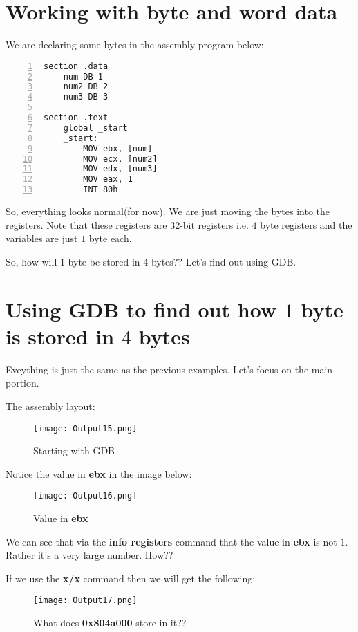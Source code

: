 \documentclass{article}
\makeatletter
\renewcommand\paragraph{\@startsection{paragraph}{4}{\z@}{-3.25ex \@plus -1ex \@minus -.2ex}{1.5ex \@plus .2ex}{\normalfont\normalsize\bfseries}}
\makeatother
\begin{document}
\section{Working with byte and word data}\label{sec:byteANDword}
\paragraph{}
We are declaring some bytes in the assembly program below:
\begin{Verbatim}[numbers=left, frame=single]
section .data
	num DB 1
	num2 DB 2
	num3 DB 3

section .text
	global _start
	_start:
		MOV ebx, [num]
		MOV ecx, [num2]
		MOV edx, [num3]
		MOV eax, 1
		INT 80h
\end{Verbatim}
So, everything looks normal(for now). We are just moving the bytes into the registers. Note that these registers are $32$-bit registers i.e. $4$ byte registers and the variables are just $1$ byte each.

So, how will $1$ byte be stored in 4 bytes?? Let's find out using GDB.

\newpage
\section{Using GDB to find out how $1$ byte is stored in $4$ bytes}\label{sec:how}
\paragraph{}
Eveything is just the same as the previous examples. Let's focus on the main portion.

The assembly layout:
\begin{figure}[h]
\centering
\texttt{[image: Output15.png]}
\caption{Starting with GDB}
\end{figure}

Notice the value in \textbf{ebx} in the image below:
\begin{figure}[h]
\centering
\texttt{[image: Output16.png]}
\caption{Value in \textbf{ebx}}
\label{fig:inEBX}
\end{figure}

We can see that via the \textbf{info registers} command that the value in \textbf{ebx} is not $1$. Rather it's a very large number.
\newpage
How??

If we use the \textbf{x/x} command then we will get the following:
\begin{figure}[h]
\centering
\texttt{[image: Output17.png]}
\caption{What does \textbf{0x804a000} store in it??}
\end{figure}
\end{document}
